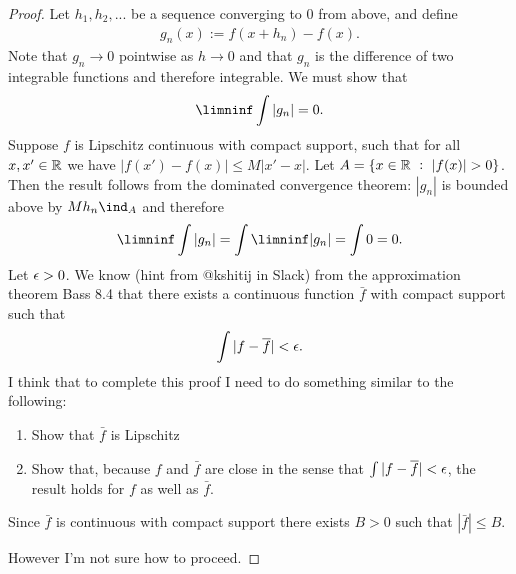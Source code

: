\begin{proof}
  Let $h_1, h_2, ...$ be a sequence converging to $0$ from above, and define
  \begin{align*}
    g_n(x) := f(x + h_n) - f(x).
  \end{align*}
  Note that $g_n \to 0$ pointwise as $h \to 0$ and that $g_n$ is the difference of two integrable functions and
  therefore integrable. We must show that
  \begin{align*}
    \limninf \int |g_n| = 0.
  \end{align*}
  Suppose $f$ is Lipschitz continuous with compact support, such that for all $x, x' \in \mathbb{R}$ we
  have $|f(x') - f(x)| \leq M|x' - x|$. Let $A = \{x \in \mathbb{R} ~:~ |f(x)| > 0 \}$. Then the result follows from
  the dominated convergence theorem: $|g_n|$ is bounded above by $Mh_n\ind_A$ and therefore
  \begin{align*}
    \limninf \int |g_n| = \int \limninf |g_n| = \int 0 = 0.
  \end{align*}
  Let $\epsilon > 0$. We know (hint from @kshitij in Slack) from the approximation theorem Bass 8.4 that there
  exists a continuous function $\bar f$ with compact support such that
  \begin{align*}
    \int |f - \overline f| < \epsilon.
  \end{align*}
  I think that to complete this proof I need to do something similar to the following:

  \begin{enumerate}
  \item Show that $\bar f$ is Lipschitz
  \item Show that, because $f$ and $\bar f$ are close in the sense that $\int |f - \overline f| < \epsilon$, the result
    holds for $f$ as well as $\bar f$.
  \end{enumerate}
  Since $\bar f$ is continuous with compact support there exists $B > 0$ such that $|\bar f| \leq B$.

  However I'm not sure how to proceed.
\end{proof}



